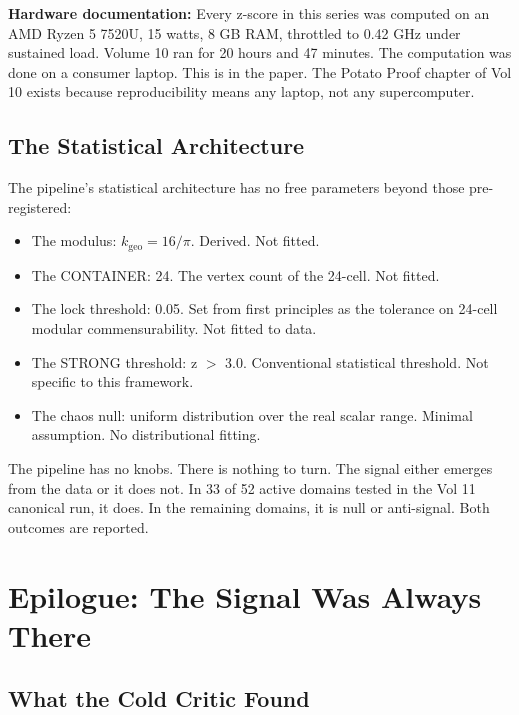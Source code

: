 \documentclass[11pt, letterpaper, openany]{book}
\begin{document}
\textbf{Hardware documentation:} Every z-score in this series
was computed on an AMD Ryzen 5 7520U, 15 watts, 8 GB RAM,
throttled to 0.42 GHz under sustained load. Volume 10 ran
for 20 hours and 47 minutes. The computation was done on a consumer
laptop. This is in the paper. The Potato Proof chapter of Vol 10
exists because reproducibility means any laptop, not any supercomputer.

\section{The Statistical Architecture}

The pipeline's statistical architecture has no free parameters
beyond those pre-registered:

\begin{itemize}
    \item The modulus: $k_\text{geo} = 16/\pi$. Derived. Not fitted.
    \item The CONTAINER: 24. The vertex count of the 24-cell. Not fitted.
    \item The lock threshold: 0.05. Set from first principles as the tolerance
    on 24-cell modular commensurability. Not fitted to data.
    \item The STRONG threshold: z $>$ 3.0. Conventional statistical threshold.
    Not specific to this framework.
    \item The chaos null: uniform distribution over the real scalar range.
    Minimal assumption. No distributional fitting.
\end{itemize}

The pipeline has no knobs. There is nothing to turn. The signal either
emerges from the data or it does not. In 33 of 52 active domains
tested in the Vol 11 canonical run, it does. In the remaining domains,
it is null or anti-signal. Both outcomes are reported.

\clearpage
\chapter*{Epilogue: The Signal Was Always There}

\section*{What the Cold Critic Found}
\end{document}
